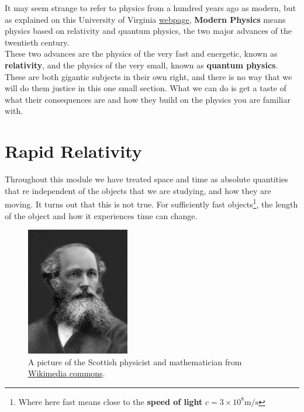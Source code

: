 \documentclass[a4paper,12pt]{book}
\begin{document}
It may seem strange to refer to physics from a hundred years ago as modern, but as explained on this University of Virginia \href{https://galileo.phys.virginia.edu/classes/252/home.html}{webpage}, \textbf{Modern Physics} means physics based on relativity and quantum physics, the two major advances of the twentieth century.\\

These two advances are the physics of the very fast and energetic, known as \textbf{relativity}, and the physics of the very small, known as \textbf{quantum physics}. These are both gigantic subjects in their own right, and there is no way that we will do them justice in this one small section. What we can do is get a taste of what their consequences are and how they build on the physics you are familiar with.

\section{Rapid Relativity}
Throughout this module we have treated space and time as absolute quantities that re independent of the objects that we are studying, and how they are moving. It turns out that this is not true. For sufficiently fast objects\footnote{Where here fast means close to the \textbf{speed of light} $c=3\times10^{8}\text{m/s}$}, the length of the object and how it experiences time can change.\\

\begin{figure}[ht]
    \centering
  \includegraphics[width=0.4\textwidth]{figures/James-Clerk-Maxwell.jpg}
    \caption{A picture of the Scottish physicist and mathematician from \href{https://upload.wikimedia.org/wikipedia/commons/b/b0/James-Clerk-Maxwell-1831-1879.jpg}{Wikimedia commons}.}
\end{figure}
\end{document}
